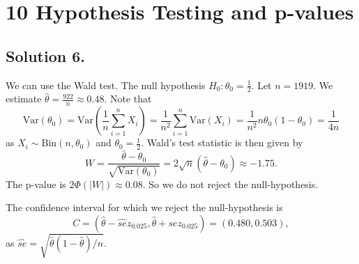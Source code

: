 \section*{10 Hypothesis Testing and p-values}

\subsection*{Solution 6.}

We can use the Wald test.
The null hypothesis $H_0: \theta_0 = \frac{1}{2}$.
Let $n = 1919$.
We estimate $\hat{\theta} = \frac{922}{n} \approx 0.48$.
Note that
$$
\mathrm{Var}(\theta_0)
    = \mathrm{Var}(\frac{1}{n} \sum_{i=1}^n X_i)
    = \frac{1}{n^2} \sum_{i=1}^n \mathrm{Var}(X_i)
    = \frac{1}{n^2} n \theta_0 (1 - \theta_0)
    = \frac{1}{4n}
$$
as $X_i \sim \mathrm{Bin}(n, \theta_0)$ and $\theta_0 = \frac{1}{2}$.
Wald's test statistic is then given by
$$
W = \frac{\hat{\theta} - \theta_0}{\sqrt{\mathrm{Var}(\theta_0)}}
    = 2\sqrt{n} (\hat{\theta} - \theta_0)
    \approx -1.75.
$$
The p-value is $2\Phi(|W|) \approx 0.08$.
So we do not reject the null-hypothesis.

The confidence interval for which we reject the null-hypothesis is
$$
C = (\hat{\theta} - \hat{se} z_{0.025}, \hat{\theta} + \hat{se} z_{0.025})
    = (0.480, 0.503),
$$
as $\hat{se} = \sqrt{\hat{\theta}(1 - \hat{\theta})/n}$.
